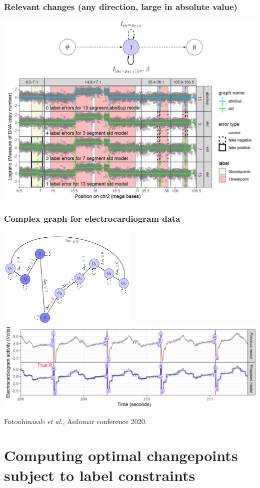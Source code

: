 \documentclass{beamer}
\begin{document}
\begin{frame}
  \frametitle{Relevant changes (any direction, large in absolute value)}
  \includegraphics[width=\textwidth]{gfpop-absolute}
\end{frame}

\begin{frame}
  \frametitle{Complex graph for electrocardiogram data}
  \includegraphics[width=0.5\textwidth]{gfpop-ecg-graph}
  \includegraphics[width=\textwidth]{gfpop-ecg-data}

  Fotoohinasab \emph{et al.}, Asilomar conference 2020.

\end{frame}

\section{Computing optimal changepoints subject to label constraints}
\end{document}
